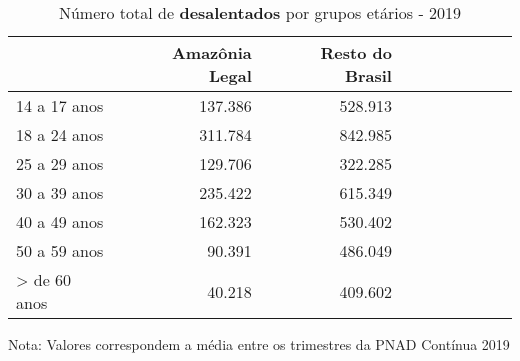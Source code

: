 \begin{table}[H]
\centering
\label{\_retrato\_emprego\_fotografia\_faixa\_etaria\_table\_desalentados}
\begin{threeparttable}
\caption{Número total de \textbf{desalentados} por grupos etários - 2019}
\begin{tabular}{l*{3}{rrr}}
\midrule \midrule
                    &Amazônia Legal&Resto do Brasil\\
\midrule
14 a 17 anos        &     137.386&     528.913\\
18 a 24 anos        &     311.784&     842.985\\
25 a 29 anos        &     129.706&     322.285\\
30 a 39 anos        &     235.422&     615.349\\
40 a 49 anos        &     162.323&     530.402\\
50 a 59 anos        &      90.391&     486.049\\
> de 60 anos        &      40.218&     409.602\\
\bottomrule
\end{tabular}
\begin{tablenotes}
\scriptsize{Nota: Valores correspondem a média entre os trimestres da PNAD Contínua 2019}
\end{tablenotes}
\end{threeparttable}
\end{table}
